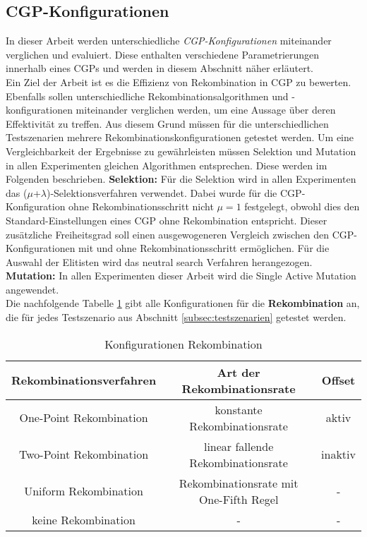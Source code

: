 \subsection{CGP-Konfigurationen}
\label{subsec:CGPkonfigurationen}

In dieser Arbeit werden unterschiedliche \emph{CGP-Konfigurationen} miteinander verglichen und evaluiert. 
Diese enthalten verschiedene Parametrierungen innerhalb eines CGPs und werden in diesem Abschnitt näher erläutert.\\
Ein Ziel der Arbeit ist es die Effizienz von Rekombination in CGP zu bewerten.
Ebenfalls sollen unterschiedliche Rekombinationsalgorithmen und -konfigurationen miteinander verglichen werden, um eine Aussage über deren Effektivität zu treffen.
Aus diesem Grund müssen für die unterschiedlichen Testszenarien mehrere Rekombinationskonfigurationen getestet werden.
Um eine Vergleichbarkeit der Ergebnisse zu gewährleisten müssen Selektion und Mutation in allen Experimenten gleichen Algorithmen entsprechen.
Diese werden im Folgenden beschrieben.\newline
\textbf{Selektion:} Für die Selektion wird in allen Experimenten das ($\mu$+$\lambda$)-Selektionsverfahren verwendet.
Dabei wurde für die CGP-Konfiguration ohne Rekombinationsschritt nicht $\mu = 1$ festgelegt, obwohl dies den Standard-Einstellungen eines CGP ohne Rekombination entspricht.
Dieser zusätzliche Freiheitsgrad soll einen ausgewogeneren Vergleich zwischen den CGP-Konfigurationen mit und ohne Rekombinationsschritt ermöglichen.
Für die Auswahl der Elitisten wird das neutral search Verfahren herangezogen.\\
\textbf{Mutation:} In allen Experimenten dieser Arbeit wird die Single Active Mutation angewendet.\\

Die nachfolgende Tabelle \ref{table:Rekombinationskonfigurationen} gibt alle Konfigurationen für die \textbf{Rekombination} an, die für jedes Testszenario aus Abschnitt \ref{subsec:testszenarien} getestet werden.

\begin{table}[H]
	\centering
	\begin{tabular}{c | c | c}
		\textbf{Rekombinationsverfahren} & \textbf{Art der Rekombinationsrate} & \textbf{Offset}\\
		\hline
		One-Point Rekombination & konstante Rekombinationsrate  & aktiv \\
		\hline
		Two-Point Rekombination & linear fallende Rekombinationsrate & inaktiv \\
		\hline
		Uniform Rekombination & Rekombinationsrate mit One-Fifth Regel & - \\
		\hline
		keine Rekombination &  - &  - \\
	\end{tabular}
	\caption{Konfigurationen Rekombination}
	\label{table:Rekombinationskonfigurationen}
\end{table}

